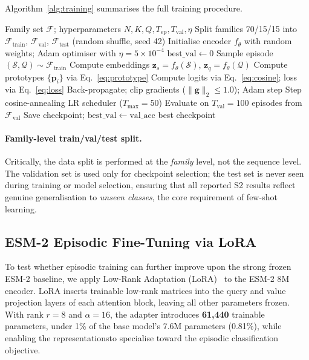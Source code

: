 \documentclass[11pt,a4paper]{article}
\newcommand{\vect}[1]{\mathbf{#1}}
\newcommand{\encoder}{f_\theta}
\begin{document}
Algorithm~\ref{alg:training} summarises the full training procedure.

\begin{algorithm}[H]
\caption{Episodic Prototypical Network Training}
\label{alg:training}
\begin{algorithmic}[1]
\Require Family set $\mathcal{F}$; hyperparameters $N,K,Q,T_{\text{ep}},T_{\text{val}},\eta$
\State Split families 70/15/15 into $\mathcal{F}_{\text{train}}$, $\mathcal{F}_{\text{val}}$, $\mathcal{F}_{\text{test}}$ (random shuffle, seed 42)
\State Initialise encoder $\encoder$ with random weights; Adam optimiser with $\eta = 5\times 10^{-4}$
\State $\mathrm{best\_val} \leftarrow 0$
   
    \State Sample episode $(\mathcal{S},\mathcal{Q}) \sim \mathcal{F}_{\text{train}}$
    \State Compute embeddings $\vect{z}_s = \encoder(\mathcal{S})$,
           $\vect{z}_q = \encoder(\mathcal{Q})$
    \State Compute prototypes $\{\vect{p}_i\}$ via Eq.~\eqref{eq:prototype}
    \State Compute logits via Eq.~\eqref{eq:cosine}; loss via Eq.~\eqref{eq:loss}
    \State Back-propagate; clip gradients ($\|\vect{g}\|_2 \leq 1.0$); Adam step
  \EndFor
  \State Step cosine-annealing LR scheduler ($T_{\max}=50$)
  \State Evaluate on $T_{\text{val}} = 100$ episodes from $\mathcal{F}_{\text{val}}$
    \State Save checkpoint; $\mathrm{best\_val} \leftarrow \mathrm{val\_acc}$
  \EndIf
\EndFor
\State \Return best checkpoint
\end{algorithmic}
\end{algorithm}

\paragraph{Family-level train/val/test split.}
Critically, the data split is performed at the \emph{family} level, not the
sequence level.  The validation set is used only for checkpoint selection; the
test set is never seen during training or model selection, ensuring that all
reported S2 results reflect genuine generalisation to \emph{unseen classes}, the
core requirement of few-shot learning.

\subsection{ESM-2 Episodic Fine-Tuning via LoRA}
\label{sec:lora}

To test whether episodic training can further improve upon the strong frozen
ESM-2 baseline, we apply Low-Rank Adaptation
(LoRA)~\cite{hu2022lora} to the ESM-2 8M encoder.  LoRA inserts trainable
low-rank matrices into the query and value projection layers of each attention
block, leaving all other parameters frozen.  With rank $r=8$ and $\alpha=16$,
the adapter introduces \textbf{61,440} trainable parameters, under 1\% of
        the base model's 7.6M parameters (0.81\%), while enabling the representationsto specialise toward the episodic classification objective.
\end{document}
